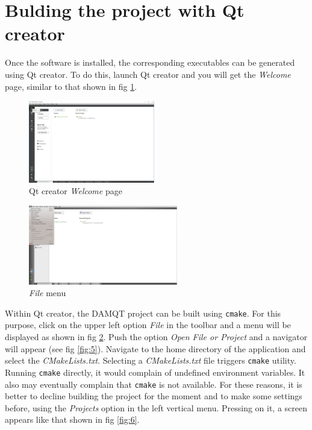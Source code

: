 \documentclass[a4paper,10pt]{article}
\begin{document}
\section{Bulding the project with Qt creator}

Once the software is installed, the corresponding executables can be generated using Qt creator.
To do this, launch Qt creator and you will get the {\it Welcome} page, similar to that shown in fig \ref{fig:3}.

\begin{minipage}{0.5\linewidth}
\begin{figure}[H]
\begin{center}
\vspace*{-3mm}
\includegraphics[width=5.5cm]{fig3.png}
\vspace*{-1mm}
\caption{\small Qt creator {\it Welcome} page\label{fig:3}}
\end{center}
\end{figure}
\end{minipage}
\begin{minipage}{0.5\linewidth}
\begin{figure}[H]
\begin{center}
\vspace*{-3mm}
\includegraphics[width=6.5cm]{fig4.png}
\caption{\small {\it File} menu \label{fig:4}}
\end{center}
\end{figure}
\end{minipage}


Within Qt creator, the DAMQT project can be built using \texttt{cmake}. For this purpose, click on the
upper left option {\it File} in the toolbar and a menu will be displayed as shown in fig \ref{fig:4}.
Push the option {\it Open File or Project} and a navigator will appear (see fig \ref{fig:5}).
Navigate to the home directory of the application and select the
{\it CMakeLists.txt}. Selecting a {\it CMakeLists.txt} file triggers \texttt{cmake} utility. Running \texttt{cmake} 
directly, it would complain of undefined environment variables. It also may eventually complain that \texttt{cmake} 
is not available. For these reasons, it is better to decline building the project for the moment and to make some settings before,
using the {\it Projects} option in the left vertical menu. Pressing on it, a screen appears like that shown in fig \ref{fig:6}.
\end{document}
